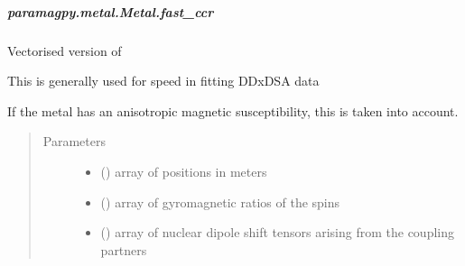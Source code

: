 \documentclass[a4paper,10pt,english,openany,oneside]{sphinxmanual}
\begin{document}
\begin{fulllineitems}
\begin{fulllineitems}
\subparagraph{paramagpy.metal.Metal.fast\_ccr}
\label{\detokenize{reference/generated/paramagpy.metal.Metal.fast_ccr:paramagpy-metal-metal-fast-ccr}}\label{\detokenize{reference/generated/paramagpy.metal.Metal.fast_ccr::doc}}

\begin{fulllineitems}
\label{\detokenize{reference/generated/paramagpy.metal.Metal.fast_ccr:paramagpy.metal.Metal.fast_ccr}}
\sphinxAtStartPar
Vectorised version of {\hyperref[\detokenize{reference/generated/paramagpy.metal.Metal.ccr:paramagpy.metal.Metal.ccr}]{}}

\sphinxAtStartPar
This is generally used for speed in fitting DDxDSA data

\sphinxAtStartPar
If the metal has an anisotropic magnetic susceptibility, this is
taken into account.
\begin{quote}\begin{description}
\item[{Parameters}] \leavevmode\begin{itemize}
\item {} 
\sphinxAtStartPar
{} (\sphinxstyleliteralemphasis{\sphinxupquote{ (}}\sphinxstyleliteralemphasis{\sphinxupquote{,}}\sphinxstyleliteralemphasis{\sphinxupquote{)}}) \textendash{} array of positions in meters

\item {} 
\sphinxAtStartPar
{} (\sphinxstyleliteralemphasis{\sphinxupquote{ (}}\sphinxstyleliteralemphasis{\sphinxupquote{,}}\sphinxstyleliteralemphasis{\sphinxupquote{)}}) \textendash{} array of gyromagnetic ratios of the spins

\item {} 
\sphinxAtStartPar
{} (\sphinxstyleliteralemphasis{\sphinxupquote{ (}}\sphinxstyleliteralemphasis{\sphinxupquote{,}}\sphinxstyleliteralemphasis{\sphinxupquote{,}}\sphinxstyleliteralemphasis{\sphinxupquote{)}}) \textendash{} array of nuclear dipole shift tensors arising from
the coupling partners


\end{itemize}
\end{description}
\end{quote}
\end{fulllineitems}
\end{fulllineitems}
\end{fulllineitems}
\end{document}
